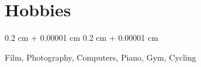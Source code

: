 \documentclass[10pt, letterpaper]{article}
\newenvironment{onecolentry}{
    \begin{adjustwidth}{
        0.2 cm + 0.00001 cm
    }{
        0.2 cm + 0.00001 cm
    }
}{
    \end{adjustwidth}
} %
\begin{document}
    \section{Hobbies}



        
        \begin{onecolentry}
            Film, Photography, Computers, Piano, Gym, Cycling
        \end{onecolentry}


    
\end{document}

